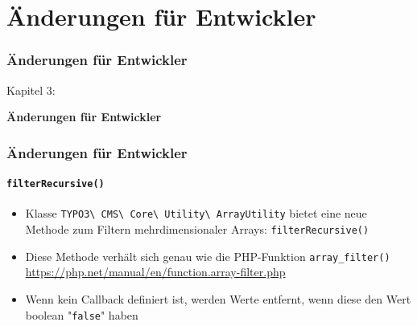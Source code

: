 %

\section{Änderungen für Entwickler}
\begin{frame}[fragile]
	\frametitle{Änderungen für Entwickler}

	\begin{center}\huge{Kapitel 3:}\end{center}
	\begin{center}\huge{\color{typo3darkgrey}\textbf{Änderungen für Entwickler}}\end{center}

\end{frame}


\begin{frame}[fragile]
	\frametitle{Änderungen für Entwickler}
	\framesubtitle{\texttt{filterRecursive()}}

	\begin{itemize}
		\item Klasse
			\texttt{TYPO3\textbackslash
				CMS\textbackslash
				Core\textbackslash
				Utility\textbackslash
				ArrayUtility}\newline
			bietet eine neue Methode zum Filtern mehrdimensionaler Arrays:\newline
			\texttt{filterRecursive()}
		\item Diese Methode verhält sich genau wie die PHP-Funktion \texttt{array\_filter()}\newline
			\small
				\href{https://php.net/manual/en/function.array-filter.php}{https://php.net/manual/en/function.array-filter.php}
			\normalsize
		\item Wenn kein Callback definiert ist, werden Werte entfernt, wenn diese den Wert boolean "\texttt{false}" haben
	\end{itemize}

\end{frame}

